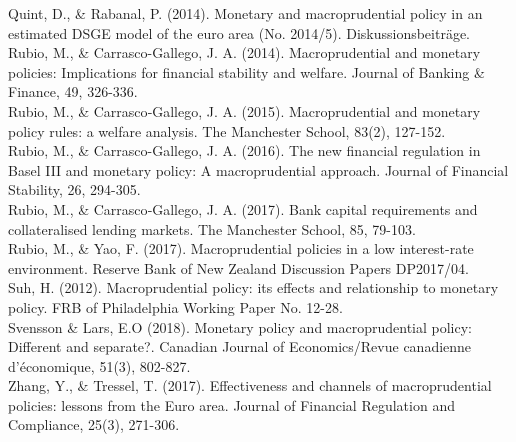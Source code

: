 \documentclass[final,3p,times,twocolumn]{elsarticle}
\begin{document}
Quint, D., \& Rabanal, P. (2014). Monetary and macroprudential policy in an estimated DSGE model of the euro area (No. 2014/5). Diskussionsbeiträge. \\

Rubio, M., \& Carrasco-Gallego, J. A. (2014). Macroprudential and monetary policies: Implications for financial stability and welfare. Journal of Banking \& Finance, 49, 326-336. \\ 

Rubio, M., \& Carrasco‐Gallego, J. A. (2015). Macroprudential and monetary policy rules: a welfare analysis. The Manchester School, 83(2), 127-152. \\ 

Rubio, M., \& Carrasco-Gallego, J. A. (2016). The new financial regulation in Basel III and monetary policy: A macroprudential approach. Journal of Financial Stability, 26, 294-305. \\ 

Rubio, M., \& Carrasco‐Gallego, J. A. (2017). Bank capital requirements and collateralised lending markets. The Manchester School, 85, 79-103. \\ 

Rubio, M., \& Yao, F. (2017). Macroprudential policies in a low interest-rate environment. Reserve Bank of New Zealand Discussion Papers DP2017/04. \\ 

Suh, H. (2012). Macroprudential policy: its effects and relationship to monetary policy. FRB of Philadelphia Working Paper No. 12-28. \\

Svensson \& Lars, E.O (2018). Monetary policy and macroprudential policy: Different and separate?. Canadian Journal of Economics/Revue canadienne d'économique, 51(3), 802-827. \\

Zhang, Y., \& Tressel, T. (2017). Effectiveness and channels of macroprudential policies: lessons from the Euro area. Journal of Financial Regulation and Compliance, 25(3), 271-306. \\



\end{document}
